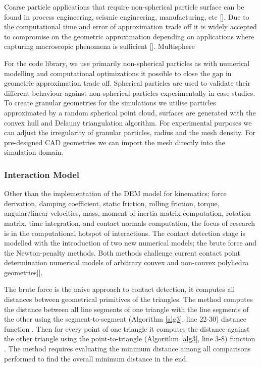 \documentclass[times,12pt]{article}
\begin{document}
Coarse particle applications that require non-spherical particle surface can be found in process engineering, seismic engineering, manufacturing, etc []. Due to the computational time and error of approximation trade off it is widely accepted to compromise on the geometric approximation depending on applications where capturing macroscopic phenomena is sufficient []. Multisphere  

For the code library, we use primarily non-spherical particles as with numerical modelling and computational optimizations it possible to close the gap in geometric approximation trade off. Spherical particles are used to validate their different behaviour against non-spherical particles experimentally in case studies. To create granular geometries for the simulations we utilise particles approximated by a random spherical point cloud, surfaces are generated with the convex hull and Delauny triangulation algorithm. For experimental purposes we can adjust the irregularity of granular particles, radius and the mesh density. For pre-designed CAD geometries we can import the mesh directly into the simulation domain.


\subsubsection{Interaction Model}

Other than the implementation of the DEM model for kinematics; force derivation, damping coefficient, static friction, rolling friction, torque, angular/linear velocities, mass, moment of inertia matrix computation, rotation matrix, time integration, and contact normals computation, the focus of research is in the computational hotspot of interactions. The contact detection stage is modelled with the introduction of two new numerical models; the brute force and the Newton-penalty methods. Both methods challenge current contact point determination numerical models of arbitrary convex and non-convex polyhedra geometries[]. 

The brute force is the naive approach to contact detection, it computes all distances between geometrical primitives of the triangles. The method computes the distance between all line segments of one triangle with the line segments of the other using the segment-to-segment (Algorithm \ref{alg3}, line 22-30) distance function \cite{Ericson2005, Tropp2006}. Then for every point of one triangle it computes the distance against the other triangle using the point-to-triangle (Algorithm \ref{alg3}, line 3-8) function \cite{Eberly1999, Ericson2005}. The method requires evaluating the minimum distance among all comparisons performed to find the overall minimum distance in the end.
\end{document}
